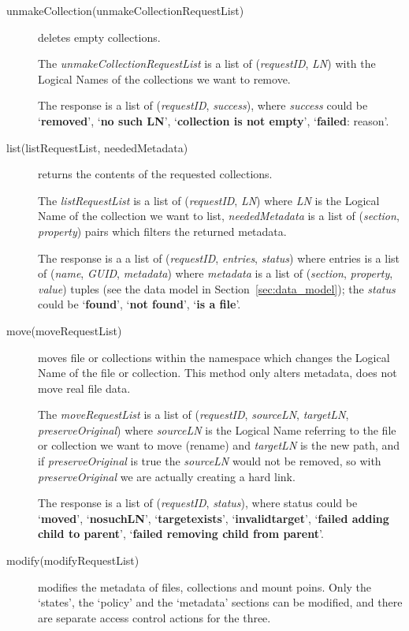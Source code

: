 \documentclass{book}
\begin{document}
\begin{description}
    \item[unmakeCollection(unmakeCollectionRequestList)] deletes empty collections.

    The \emph{unmakeCollectionRequestList} is a list of (\emph{requestID}, \emph{LN}) with the Logical Names of the collections we want to remove. 

    The response is a list of (\emph{requestID}, \emph{success}), where \emph{success} could be `\textbf{removed}', `\textbf{no such LN}', `\textbf{collection is not empty}', `\textbf{failed}: reason'.
    
    \item[list(listRequestList, neededMetadata)] returns the contents of the requested collections.
        
    The \emph{listRequestList} is a list of (\emph{requestID}, \emph{LN}) where \emph{LN} is the Logical Name of the collection we want to list, \emph{neededMetadata} is a list of (\emph{section}, \emph{property}) pairs which filters the returned metadata.
    
    The response is a a list of (\emph{requestID}, \emph{entries}, \emph{status}) where entries is a list of (\emph{name}, \emph{GUID}, \emph{metadata}) where \emph{metadata} is a list of (\emph{section}, \emph{property}, \emph{value}) tuples (see the data model in Section~\ref{sec:data_model}); the \emph{status} could be `\textbf{found}', `\textbf{not found}', `\textbf{is a file}'.
    
    \item[move(moveRequestList)] moves file or collections within the namespace which changes the Logical Name of the file or collection. This method only alters metadata, does not move real file data.

    The \emph{moveRequestList} is a list of (\emph{requestID}, \emph{sourceLN}, \emph{targetLN}, \emph{preserveOriginal}) where \emph{sourceLN} is the Logical Name referring to the file or collection we want to move (rename) and \emph{targetLN} is the new path, and if \emph{preserveOriginal} is true the \emph{sourceLN} would not be removed, so with \emph{preserveOriginal} we are actually creating a hard link.
    
    The response is a list of (\emph{requestID}, \emph{status}), where status could be `\textbf{moved}', `\textbf{nosuchLN}', `\textbf{targetexists}', `\textbf{invalidtarget}', `\textbf{failed adding child to parent}', `\textbf{failed removing child from parent}'.
    
    \item[modify(modifyRequestList)] modifies the metadata of files, collections and mount poins. Only the `states', the `policy' and the `metadata' sections can be modified, and there are separate access control actions for the three.
    

\end{description}
\end{document}
